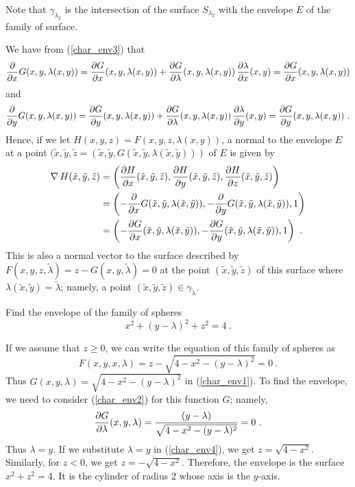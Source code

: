 Note that $\gamma_{\lambda_2}$ is the intersection of the
surface $S_{\lambda_2}$ with the envelope $E$ of the family of
surface.

\begin{rmk}
We have from (\ref{char_env3}) that               \label{char_env_tgp}
\[
\pdfdx{G(x,y,\lambda(x,y))}{x}
= \pdydx{G}{x}(x,y,\lambda(x,y)) + \pdydx{G}{\lambda}(x,y,\lambda(x,y))\,
 \pdydx{\lambda}{x}(x,y) = \pdydx{G}{x}(x,y,\lambda(x,y))
\]
and
\[
\pdfdx{G(x,y,\lambda(x,y))}{y}
= \pdydx{G}{y}(x,y,\lambda(x,y)) + \pdydx{G}{\lambda}(x,y,\lambda(x,y))\,
 \pdydx{\lambda}{y}(x,y) = \pdydx{G}{y}(x,y,\lambda(x,y)) \ .
\]
Hence, if we let $H(x,y,z) = F(x,y,z,\lambda(x,y))$, a normal to the
envelope $E$ at a point
$(\tilde{x},\tilde{y},\tilde{z}
= (\tilde{x},\tilde{y},G(\tilde{x},\tilde{y},\lambda(\tilde{x},\tilde{y})))$
of $E$ is given by
\begin{align*}
\graD H(\tilde{x},\tilde{y},\tilde{z}) &=
\left( \pdydx{H}{x}(\tilde{x},\tilde{y},\tilde{z}) ,
\pdydx{H}{y}(\tilde{x},\tilde{y},\tilde{z}) ,
\pdydx{H}{z}(\tilde{x},\tilde{y},\tilde{z}) \right) \\
&= \left( -\pdfdx{G(\tilde{x},\tilde{y},\lambda(\tilde{x},\tilde{y}))}{x} ,
-\pdfdx{G(\tilde{x},\tilde{y},\lambda(\tilde{x},\tilde{y}))}{y}, 1 \right) \\
&= \left( -\pdydx{G}{x}(\tilde{x},\tilde{y},\lambda(\tilde{x},\tilde{y})) ,
-\pdydx{G}{y}(\tilde{x},\tilde{y},\lambda(\tilde{x},\tilde{y})), 1 \right) \ .
\end{align*}
This is also a normal vector to the surface described by
$F(x,y,z,\tilde{\lambda}) = z - G(x,y,\tilde{\lambda}) = 0$
at the point $(\tilde{x},\tilde{y},\tilde{z})$ of this surface where
$\lambda(\tilde{x},\tilde{y}) = \tilde{\lambda}$; namely, a point    
$(\tilde{x},\tilde{y},\tilde{z}) \in \gamma_{\tilde{\lambda}}$.
\end{rmk}

\begin{egg}
Find the envelope of the family of spheres
\[
x^2 + (y-\lambda)^2 + z^2 = 4 \ .
\]

If we assume that $z \geq 0$, we can write the equation of this
family of spheres as
\begin{equation} \label{char_env4}
F(x,y,x,\lambda) = z - \sqrt{4-x^2-(y-\lambda)^2} = 0 \ .
\end{equation}
Thus $\displaystyle G(x,y,\lambda) = \sqrt{4-x^2-(y-\lambda)^2}$ in
(\ref{char_env1}).  To find the envelope, we need to consider
(\ref{char_env2}) for this function $G$; namely,
\[
\pdydx{G}{\lambda}(x,y,\lambda) =
\frac{(y-\lambda)}{\sqrt{4-x^2-(y-\lambda)^2}} = 0 \ .
\]
Thus $\lambda = y$.  If we substitute $\lambda = y$ in
(\ref{char_env4}), we get $\displaystyle z = \sqrt{4-x^2}$.
Similarly, for $z<0$, we get $\displaystyle z = -\sqrt{4-x^2}$.
Therefore, the envelope is the surface $\displaystyle x^2 + z^2 = 4$.
It is the cylinder of radius $2$ whose axis is the $y$-axis.
\end{egg}

